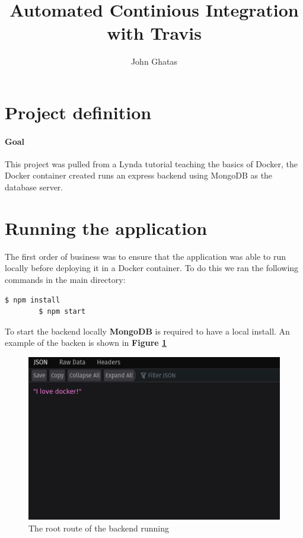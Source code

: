 \documentclass{paper}
\title{Automated Continious Integration with Travis}
\date{\displaydate{date}}
\author{John Ghatas}
\begin{document}
    \maketitle
    \newpage
    
    \tableofcontents
    \newpage

    \section{Project definition}
    \paragraph{Goal}{This project was pulled from a Lynda tutorial teaching the basics of Docker, 
    the Docker container created runs an express backend using MongoDB as the database server.}

    \section{Running the application}{The first order of business was to ensure that the application
    was able to run locally before deploying it in a Docker container. To do this we ran the following commands in
    the main directory:
    \begin{lstlisting}[language=bash]
        $ npm install
        $ npm start
    \end{lstlisting}
    To start the backend locally \textbf{MongoDB} is required to have a local install. An example of the backen is shown
    in \textbf{Figure \ref{fig:backend}}
    \begin{figure}[!h]
        \centering
        \includegraphics[scale=2.6, pagebox=artbox]{Images/server.png}
        \caption{The root route of the backend running}
        \label{fig:backend}
    \end{figure}
    \newpage
    }
\end{document}
